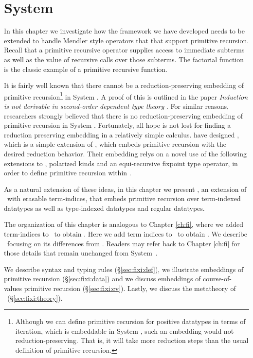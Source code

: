 \chapter{System \Fixi}\label{ch:fixi}

In this chapter we investigate how the framework we have developed needs to be extended
to handle Mendler style operators that that support primitive recursion. Recall that
a primitive recursive operator supplies access to immediate subterms as well as the
value of recursive calls over those subterms. The factorial function is the
classic example of a primitive recursive function.



It is fairly well known that there cannot be a reduction-preserving embedding of
primitive recursion\footnote{
	Although we can define primitive recursion for positive datatypes
	in terms of iteration, which is embeddable in System \F, such an
	embedding would not reduction-preserving. That is, it will take
	more reduction steps than the usual definition of primitive recursion.
	}
in System \F. A proof of this is outlined in the paper 
{\it Induction is not derivable in second-order dependent type theory}
\cite{Geuvers01}. For similar reasons, researchers strongly believed that
there is no reduction-preserving embedding of primitive recursion 
in System \Fw. Fortunately, all hope is not lost
for finding a reduction preserving embedding in a relatively simple calculus. 
\citet{AbeMat04} have designed \Fixw, which is a simple extension of \Fw,
which embeds primitive recursion with the desired reduction behavior.
Their embedding relys on a novel use of the following extensions to \Fixw,
polarized kinds and an equi-recursive fixpoint type operator,
in order to define primitive recursion within \Fixw.

As a natural extension of these ideas, in this chapter we present \Fixi,
an extension of \Fixw\ with erasable term-indices,
that embeds primitive recursion over term-indexed datatypes
as well as type-indexed datatypes and regular datatypes.

The organization of this chapter is analogous to Chapter \ref{ch:fi}, 
where we added term-indices to \Fw\ to obtain \Fi. Here
we add term indices to \Fixw\ to obtain \Fixi. We describe \Fixi\ focusing on
its differences from \Fi. Readers may refer back to Chapter \ref{ch:fi} for
those details that remain unchanged from System~\Fi.

We describe syntax and typing rules (\S\ref{sec:fixi:def}),
we illustrate embeddings of primitive recursion (\S\ref{sec:fixi:data})
and we discuss embeddings of course-of-values primitive recursion
(\S\ref{sec:fixi:cv}). Lastly, we
discuss the metatheory of \Fixi\ (\S\ref{sec:fixi:theory}).





